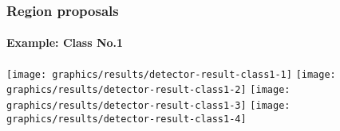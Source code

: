 
\begin{frame}
	\frametitle{Region proposals}
	\framesubtitle{Example: Class No.1}
     {
		\texttt{[image: graphics/results/detector-result-class1-1]}
	}
	\only<2-4> {
		\texttt{[image: graphics/results/detector-result-class1-2]}
	}
	\only<3-4> {
		\texttt{[image: graphics/results/detector-result-class1-3]}
	}
	\only<4> {
		\texttt{[image: graphics/results/detector-result-class1-4]}
	}
\end{frame}


